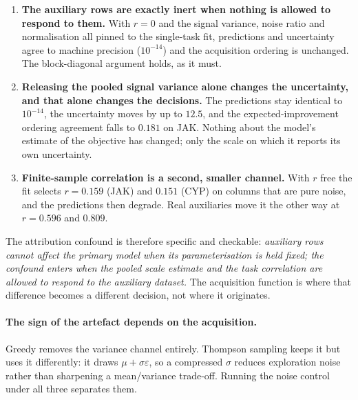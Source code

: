 \documentclass[11pt]{article}
\begin{document}
\begin{enumerate}[leftmargin=1.6em,itemsep=0.25em]
  \item \textbf{The auxiliary rows are exactly inert when nothing is allowed to
    respond to them.} With $r = 0$ and the signal variance, noise ratio and
    normalisation all pinned to the single-task fit, predictions and uncertainty
    agree to machine precision ($10^{-14}$) and the acquisition ordering is
    unchanged. The block-diagonal argument holds, as it must.
  \item \textbf{Releasing the pooled signal variance alone changes the
    uncertainty, and that alone changes the decisions.} The predictions stay
    identical to $10^{-14}$, the uncertainty moves by up to $12.5$, and the
    expected-improvement ordering agreement falls to $0.181$ on JAK. Nothing
    about the model's estimate of the objective has changed; only the scale on
    which it reports its own uncertainty.
  \item \textbf{Finite-sample correlation is a second, smaller channel.} With
    $r$ free the fit selects $r = 0.159$ (JAK) and $0.151$ (CYP) on columns that
    are pure noise, and the predictions then degrade. Real auxiliaries move it
    the other way at $r = 0.596$ and $0.809$.
\end{enumerate}

The attribution confound is therefore specific and checkable: \emph{auxiliary
rows cannot affect the primary model when its parameterisation is held fixed;
the confound enters when the pooled scale estimate and the task correlation are
allowed to respond to the auxiliary dataset.} The acquisition function is where
that difference becomes a different decision, not where it originates.

\paragraph{The sign of the artefact depends on the acquisition.} Greedy removes
the variance channel entirely. Thompson sampling keeps it but uses it
differently: it draws $\mu + \sigma\varepsilon$, so a compressed $\sigma$ reduces
exploration noise rather than sharpening a mean/variance trade-off. Running the
noise control under all three separates them.
\end{document}
